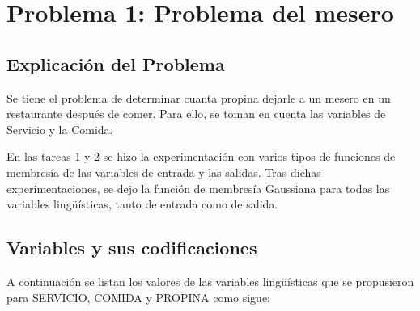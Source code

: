 \documentclass[11pt, letterpaper]{article}
\begin{document}
\newpage


\section{Problema 1: Problema del mesero}

\subsection{Explicación del Problema}

Se tiene el problema de determinar cuanta propina dejarle a un mesero en un restaurante después de comer. Para ello, se toman en cuenta las variables de Servicio y la Comida.

En las tareas 1 y 2 se hizo la experimentación con varios tipos de funciones de membresía de las variables de entrada y las salidas. Tras dichas experimentaciones, se dejo la función de membresía Gaussiana para todas las variables lingüísticas, tanto de entrada como de salida.

\subsection{Variables y sus codificaciones}

A continuación se listan los valores de las variables lingüísticas que se
propusieron para SERVICIO, COMIDA y PROPINA como sigue:
\end{document}
